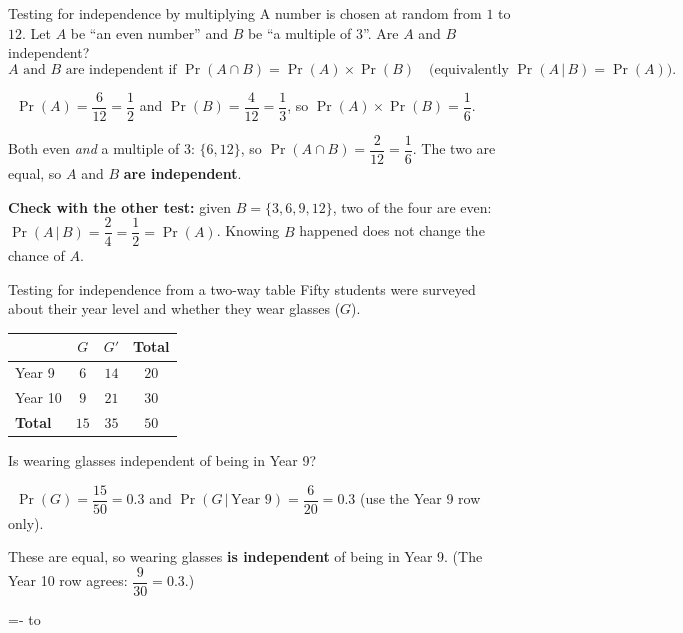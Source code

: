 \documentclass[11pt]{article}
\makeatletter
\newlength{\rulepitch}\setlength{\rulepitch}{8mm}
\newcommand{\linesfill}{\xleaders\vbox to\rulepitch{\vfil\hbox to\textwidth{\hskip\@totalleftmargin
  \color{line!140!white}\leaders\hrule height 0.3pt\hfill}}\vfill}
\newcommand{\notesfill}{\par\begingroup\dimen@ii=\pagegoal\advance\dimen@ii-\pagetotal
  \ifdim\dimen@ii>\dimexpr\rulepitch+30pt\relax\vspace{6pt}{\small\color{inksoft}\textsf{Notes}}\par\fi\endgroup\linesfill}
\newcommand{\closepart}[1]{\par\penalty-100\begingroup
  \dimen@ii=\pagegoal \advance\dimen@ii-\pagetotal
  \ifdim\pagetotal>0pt \ifdim\dimen@ii>45pt #1\fi\fi
  \endgroup\clearpage}
\newcommand{\solution}{\par\vspace{3pt}{\bfseries Solution.}\ }
\makeatother
\begin{document}
\begin{worked}{Testing for independence by multiplying}
A number is chosen at random from $1$ to $12$. Let $A$ be ``an even number'' and $B$ be ``a multiple of $3$''. Are $A$ and $B$ independent?
\[A \text{ and } B \text{ are independent if } \Pr(A\cap B)=\Pr(A)\times\Pr(B) \quad\big(\text{equivalently } \Pr(A\,|\,B)=\Pr(A)\big).\]
\solution $\Pr(A)=\dfrac{6}{12}=\dfrac12$ and $\Pr(B)=\dfrac{4}{12}=\dfrac13$, so $\Pr(A)\times\Pr(B)=\dfrac16$.\par
Both even \emph{and} a multiple of $3$: $\{6,12\}$, so $\Pr(A\cap B)=\dfrac{2}{12}=\dfrac16$. The two are equal, so $A$ and $B$ \textbf{are independent}.\par
\textbf{Check with the other test:} given $B=\{3,6,9,12\}$, two of the four are even: $\Pr(A\,|\,B)=\dfrac24=\dfrac12=\Pr(A)$. Knowing $B$ happened does not change the chance of $A$.
\end{worked}

\begin{worked}{Testing for independence from a two-way table}
Fifty students were surveyed about their year level and whether they wear glasses ($G$).
\begin{center}\renewcommand{\arraystretch}{1.3}
\begin{tabular}{|l|c|c|c|}\hline
 & $G$ & $G'$ & \textbf{Total} \\\hline
Year 9 & $6$ & $14$ & $20$ \\\hline
Year 10 & $9$ & $21$ & $30$ \\\hline
\textbf{Total} & $15$ & $35$ & $50$ \\\hline
\end{tabular}\end{center}
Is wearing glasses independent of being in Year 9?\par
\solution $\Pr(G)=\dfrac{15}{50}=0.3$ and $\Pr(G\,|\,\text{Year 9})=\dfrac{6}{20}=0.3$ (use the Year 9 row only).\par
These are equal, so wearing glasses \textbf{is independent} of being in Year 9. (The Year 10 row agrees: $\dfrac{9}{30}=0.3$.)
\end{worked}

\closepart{\notesfill}
\end{document}
